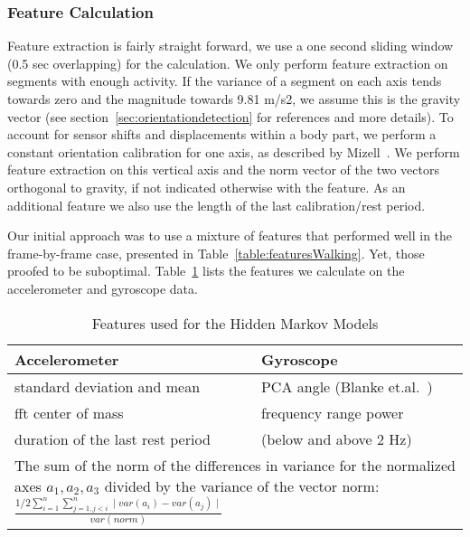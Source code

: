 \subsubsection{Feature Calculation}
Feature extraction is fairly straight forward, we  use a one second sliding window
(0.5 sec overlapping) for the calculation.  We only perform feature extraction on segments
with enough activity.  If the variance of a segment on each axis tends
towards zero and the magnitude towards 9.81 m/s2, we assume this is
the gravity vector (see section~\ref{sec:orientationdetection} for
references and more details).  To account for sensor shifts and
displacements within a body part, we perform a constant orientation
calibration for one axis, as described by
Mizell~\cite{Mizell:2005p3885}. We perform feature extraction on this
vertical axis and the norm vector of the two vectors orthogonal to
gravity, if not indicated otherwise with the feature.  As an
additional feature we also use the length of the last calibration/rest period.

Our initial approach was to use a mixture of features that performed
well in the frame-by-frame case, presented
in Table~\ref{table:featuresWalking}.  Yet, those proofed to be suboptimal.
Table~\ref{hmmfeatures} lists the features we calculate on the
accelerometer and gyroscope data.


\begin{table}[ht]
\caption{Features used for the Hidden Markov Models}
\centering

\begin{tabular}{l l}
\toprule
Accelerometer & Gyroscope\\
\toprule
standard deviation and mean & PCA angle (Blanke et.al.~\cite{Blanke:2008p6128})\\
fft center of mass & frequency range power \\
duration of the last rest period & (below and above 2 Hz)\\\midrule
\multicolumn{2}{l}{\parbox[t]{\textwidth -2cm}{The sum of the norm of the differences in variance for the normalized axes $a_{1},a_{2},a_{3}$ divided by the variance of the vector norm: 
$\frac{1/2 \displaystyle\sum\limits_{i=1}^n \sum\limits_{j=1,j<i}^n\mid var(a_{i}) - var(a_{j})\mid}{var(norm)}$
}}\\
\bottomrule
\end{tabular}
\label{hmmfeatures}
\end{table}

